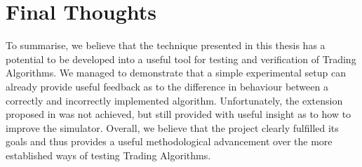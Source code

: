 \section{Final Thoughts}
To summarise, we believe that the technique presented in this thesis has a potential to be developed into a useful tool for testing and verification of Trading Algorithms. We managed to demonstrate that a simple experimental setup can already provide useful feedback as to the difference in behaviour between a correctly and incorrectly implemented algorithm. Unfortunately, the extension proposed in  was not achieved, but still provided with useful insight as to how to improve the simulator. Overall, we believe that the project clearly fulfilled its goals and thus provides a useful methodological advancement over the more established ways of testing Trading Algorithms.
